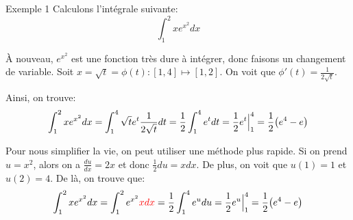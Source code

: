 \documentclass[a4paper]{article}
\begin{document}
\begin{parag}{Exemple 1}
    Calculons l'intégrale suivante: 
    \[\int_{1}^{2} x e^{x^2}dx\]
    
    À nouveau, $e^{x^2}$ est une fonction très dure à intégrer, donc faisons un changement de variable. Soit $x = \sqrt{t} = \phi\left(t\right) : \left[1, 4\right] \mapsto \left[1, 2\right]$. On voit que $\phi'\left(t\right) = \frac{1}{2\sqrt{t}}$.

    Ainsi, on trouve: 
    \[\int_{1}^{2} x e^{x^2}dx = \int_{1}^{4} \sqrt{t}e^t \frac{1}{2\sqrt{t}} dt = \frac{1}{2} \int_{1}^{4} e^t dt = \frac{1}{2} e^t \eval_{1}^{4} = \frac{1}{2} \left(e^4 - e\right)\]
    
    \vspace{1em}

    Pour nous simplifier la vie, on peut utiliser une méthode plus rapide. Si on prend $u = x^2$, alors on a $\frac{du}{dx} = 2x$ et donc $\frac{1}{2}du = xdx$. De plus, on voit que $u\left(1\right) = 1$ et $u\left(2\right) = 4$. De là, on trouve que: 
    \[\int_{1}^{2} xe^{x^2} dx = \int_{1}^{2} e^{x^2} {\color{red}xdx} = \frac{1}{2} \int_{1}^{4} e^{u} du = \frac{1}{2} e^u \eval_{1}^{4} = \frac{1}{2}\left(e^4 - e\right)\]
\end{parag}
\end{document}

